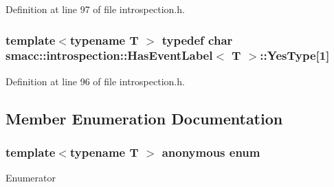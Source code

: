 Definition at line 97 of file introspection.\+h.

\subsubsection[{\texorpdfstring{Yes\+Type}{YesType}}]{\setlength{\rightskip}{0pt plus 5cm}template$<$typename T $>$ typedef char {\bf smacc\+::introspection\+::\+Has\+Event\+Label}$<$ T $>$\+::Yes\+Type\mbox{[}1\mbox{]}\hspace{0.3cm}{\ttfamily [private]}}\hypertarget{classsmacc_1_1introspection_1_1HasEventLabel_a8d4b4c2ecb640812e11e8c1407636b6a}{}\label{classsmacc_1_1introspection_1_1HasEventLabel_a8d4b4c2ecb640812e11e8c1407636b6a}


Definition at line 96 of file introspection.\+h.



\subsection{Member Enumeration Documentation}
\subsubsection[{\texorpdfstring{anonymous enum}{anonymous enum}}]{\setlength{\rightskip}{0pt plus 5cm}template$<$typename T $>$ anonymous enum}\hypertarget{classsmacc_1_1introspection_1_1HasEventLabel_a2de6073f80d42739c5ed78d301bd853b}{}\label{classsmacc_1_1introspection_1_1HasEventLabel_a2de6073f80d42739c5ed78d301bd853b}
\begin{Desc}
\item[Enumerator]\par
\begin{description}
\item[{\em 
value\hypertarget{classsmacc_1_1introspection_1_1HasEventLabel_a2de6073f80d42739c5ed78d301bd853ba3f57db3ac5b424aedec54eb89e48b732}{}\label{classsmacc_1_1introspection_1_1HasEventLabel_a2de6073f80d42739c5ed78d301bd853ba3f57db3ac5b424aedec54eb89e48b732}
}]\end{description}
\end{Desc}


